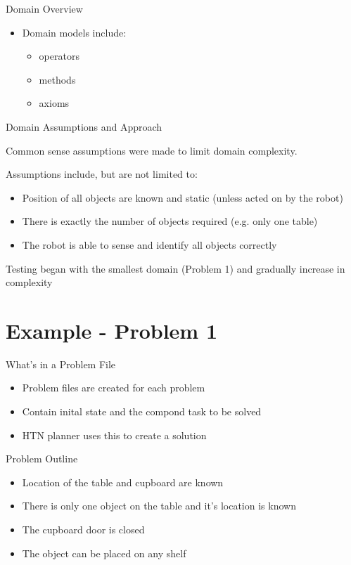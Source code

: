 \documentclass{beamer}
\begin{document}
\begin{frame}{Domain Overview}
  \begin{itemize}
    \item Domain models include:
      \begin{itemize}
        \item operators
        \item methods
        \item axioms
      \end{itemize}
  \end{itemize}
\end{frame}

\begin{frame}{Domain Assumptions and Approach}
\item Common sense assumptions were made to limit domain complexity.
\item Assumptions include, but are not limited to:
  \begin{itemize}
    \item Position of all objects are known and static (unless acted on by the robot)
    \item There is exactly the number of objects required (e.g. only one table)
    \item The robot is able to sense and identify all objects correctly
  \end{itemize}

\item Testing began with the smallest domain (Problem 1) and gradually increase in complexity
\end{frame}


\section{Example - Problem 1}
\begin{frame}{What's in a Problem File}
  \begin{itemize}
    \item Problem files are created for each problem
    \item Contain inital state and the compond task to be solved
    \item HTN planner uses this to create a solution
  \end{itemize}
\end{frame}

\begin{frame}{Problem Outline}
  \begin{itemize}
    \item Location of the table and cupboard are known
    \item There is only one object on the table and it's location is known
    \item The cupboard door is closed
    \item The object can be placed on any shelf
  \end{itemize}
\end{frame}
\end{document}
